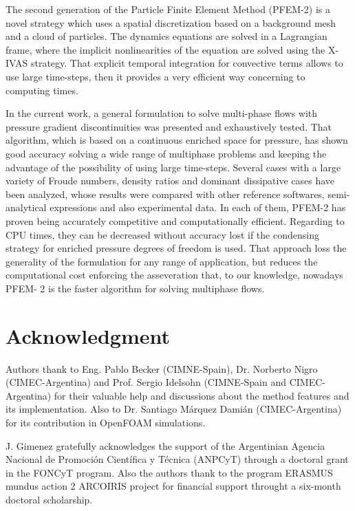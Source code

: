 \documentclass[review]{elsarticle}
\begin{document}
The second generation of the Particle Finite Element Method (PFEM-2) is a novel strategy which uses a spatial discretization based on a background mesh and a cloud of particles. The dynamics equations are solved in a Lagrangian frame, where the implicit nonlinearities of the equation are solved using the X-IVAS strategy. That explicit temporal integration for convective terms allows to use large time-steps, then it provides a very efficient way concerning to computing times.

In the current work, a general formulation to solve multi-phase flows with pressure gradient discontinuities was presented and exhaustively tested. That algorithm, which is based on a continuous enriched space for pressure, has shown good accuracy solving a wide range of multiphase problems and keeping the advantage of the possibility of using large time-steps. Several cases with a large variety of Froude numbers, density ratios and dominant dissipative cases have been analyzed, whose results were compared with other reference softwares, semi-analytical expressions and also experimental data. In each of them, PFEM-2 has proven being accurately competitive and computationally efficient. Regarding to CPU times, they can be decreased without accuracy lost if the condensing strategy for enriched pressure degrees of freedom is used. That approach loss the generality of the formulation for any range of application, but reduces the computational cost enforcing the asseveration that, to our knowledge, nowadays PFEM-
2 is the faster algorithm for solving multiphase flows.

\section*{Acknowledgment}

Authors thank to Eng. Pablo Becker (CIMNE-Spain), Dr. Norberto Nigro (CIMEC-Argentina) and Prof. Sergio Idelsohn (CIMNE-Spain and CIMEC-Argentina) for their valuable help and discussions about the method features and its implementation. Also to Dr. Santiago M\'arquez Dami\'an (CIMEC-Argentina) for its contribution in OpenFOAM simulations.

J. Gimenez gratefully acknowledges the support of the Argentinian Agencia Nacional de Promoci\'on Cient\'ifica y T\' ecnica (ANPCyT) through a doctoral grant in the FONCyT program. Also the authors thank to the program ERASMUS mundus action 2 ARCOIRIS project for financial support throught a six-month doctoral scholarship.
\end{document}

